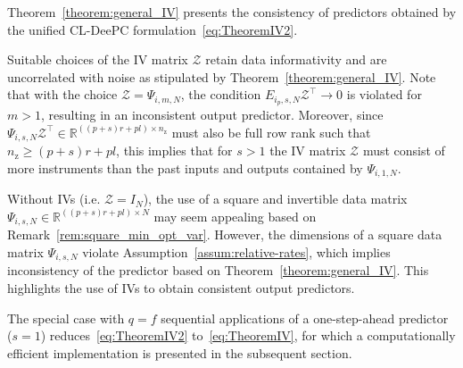 Theorem~\ref{theorem:general_IV} presents the consistency of predictors obtained by the unified \ac{CL-DeePC} formulation~\eqref{eq:TheoremIV2}. %

Suitable choices of the \ac{IV} matrix $\mathcal{Z}$ retain data informativity and are uncorrelated with noise as stipulated by Theorem~\ref{theorem:general_IV}. Note that with the choice $\mathcal{Z}=\Psi_{i,m,N}$, the condition $E_{i_p,s,N}\mathcal{Z}^\top\rightarrow0$ is violated for $m>1$, resulting in an inconsistent output predictor. Moreover, since $\Psi_{i,s,N}\mathcal{Z}^\top\in\mathbb{R}^{((p+s)r+pl)\times n_\mathrm{z}}$ must also be full row rank such that ${n_\mathrm{z}\geq(p+s)r+pl}$, this implies that for $s>1$ the \ac{IV} matrix $\mathcal{Z}$ must consist of more instruments than the past inputs and outputs contained by $\Psi_{i,1,N}$.

\setcounter{thm}{2}
\begin{rem}
Without \ac{IVs} (i.e. $\mathcal{Z}=I_N$), the use of a square and invertible data matrix ${\Psi_{i,s,N}\in\mathbb{R}^{((p+s)r+pl)\times N}}$ may seem appealing based on Remark~\ref{rem:square_min_opt_var}. However, the dimensions of a square data matrix $\Psi_{i,s,N}$ violate Assumption~\ref{assum:relative-rates}, which implies inconsistency of the predictor based on Theorem~\ref{theorem:general_IV}. This highlights the use of \ac{IVs} to obtain consistent output predictors.
\end{rem}

The special case with $q=f$ sequential applications of a one-step-ahead predictor ($s=1$) reduces~\eqref{eq:TheoremIV2} to~\eqref{eq:TheoremIV}, for which a computationally efficient implementation is presented in the subsequent section.